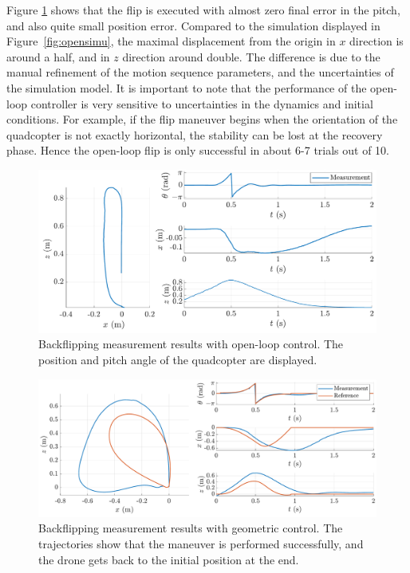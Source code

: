 Figure \ref{fig:openmeas} shows that the flip is executed with almost zero final error in the pitch, and also quite small position error. Compared to the simulation displayed in Figure~\ref{fig:opensimu}, the maximal displacement from the origin in $x$ direction is around a half, and in $z$ direction around double. The difference is due to the manual refinement of the motion sequence parameters, and the uncertainties of the simulation model. It is important to note that the performance of the open-loop controller is very sensitive to uncertainties in the dynamics and initial conditions. For example, if the flip maneuver begins when the orientation of the quadcopter is not exactly horizontal, the stability can be lost at the recovery phase. Hence the open-loop flip is only successful in about 6-7 trials out of 10.
\begin{figure}
\centering
\includegraphics[width=.95\linewidth]{Fig/openmeast.pdf}
\caption[Backflipping measurement results with open-loop control]{Backflipping measurement results with open-loop control. The position and pitch angle of the quadcopter are displayed.}\label{fig:openmeas}
\end{figure}
\newpage
\begin{figure}
\centering
\includegraphics[width=\linewidth]{Fig/geommeast2.pdf}
\caption[Backflipping measurement results with geometric control]{Backflipping measurement results with geometric control. The trajectories show that the maneuver is performed successfully, and the drone gets back to the initial position at the end.}\label{fig:geommeas}
\end{figure}

